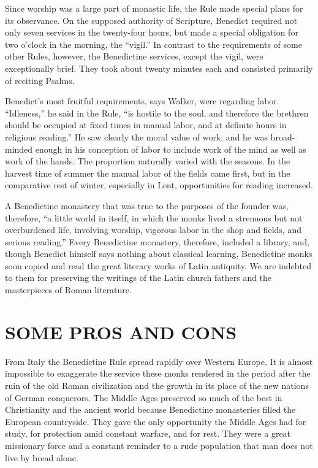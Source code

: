 Since worship was a large part of monastic life, the Rule made special plans for its observance. On
the supposed authority of Scripture, Benedict required not only seven services in the twenty-four
hours, but made a special obligation for two o’clock in the morning, the “vigil.” In contrast to the
requirements of some other Rules, however, the Benedictine services, except the vigil, were
exceptionally brief. They took about twenty minutes each and consisted primarily of reciting Psalms.

Benedict’s most fruitful requirements, says Walker, were regarding labor. “Idleness,” he said in the
Rule, “is hostile to the soul, and therefore the brethren should be occupied at fixed times in
manual labor, and at definite hours in religious reading.” He saw clearly the moral value of work;
and he was broad-minded enough in his conception of labor to include work of the mind as well as
work of the hands. The proportion naturally varied with the seasons. In the harvest time of summer
the manual labor of the fields came first, but in the comparative rest of winter, especially in
Lent, opportunities for reading increased.

A Benedictine monastery that was true to the purposes of the founder was, therefore, “a little world
in itself, in which the monks lived a strenuous but not overburdened life, involving worship,
vigorous labor in the shop and fields, and serious reading.” Every Benedictine monastery, therefore,
included a library, and, though Benedict himself says nothing about classical learning, Benedictine
monks soon copied and read the great literary works of Latin antiquity. We are indebted to them for
preserving the writings of the Latin church fathers and the masterpieces of Roman literature.

\section{SOME PROS AND CONS}

From Italy the Benedictine Rule spread rapidly over Western Europe. It is almost impossible to
exaggerate the service these monks rendered in the period after the ruin of the old Roman
civilization and the growth in its place of the new nations of German conquerors. The Middle Ages
preserved so much of the best in Christianity and the ancient world because Benedictine monasteries
filled the European countryside. They gave the only opportunity the Middle Ages had for study, for
protection amid constant warfare, and for rest. They were a great missionary force and a constant
reminder to a rude population that man does not live by bread alone.

